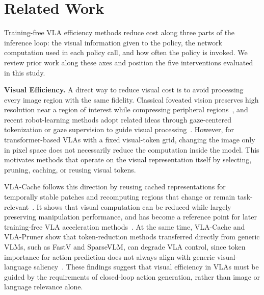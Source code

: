 \section{Related Work}

Training-free VLA efficiency methods reduce cost along three parts of the inference loop: the visual information given to the policy, the network computation used in each policy call, and how often the policy is invoked. We review prior work along these axes and position the five interventions evaluated in this study.

\noindent\textbf{Visual Efficiency.}
A direct way to reduce visual cost is to avoid processing every image region with the same fidelity. Classical foveated vision preserves high resolution near a region of interest while compressing peripheral regions~\cite{schwartz,traver}, and recent robot-learning methods adopt related ideas through gaze-centered tokenization or gaze supervision to guide visual processing~\cite{lookfocusact,gazereg}. However, for transformer-based VLAs with a fixed visual-token grid, changing the image only in pixel space does not necessarily reduce the computation inside the model. This motivates methods that operate on the visual representation itself by selecting, pruning, caching, or reusing visual tokens.

VLA-Cache follows this direction by reusing cached representations for temporally stable patches and recomputing regions that change or remain task-relevant~\cite{vlacache}. It shows that visual computation can be reduced while largely preserving manipulation performance, and has become a reference point for later training-free VLA acceleration methods~\cite{vlapruner,efficientvla,specprune}. At the same time, VLA-Cache and VLA-Pruner show that token-reduction methods transferred directly from generic VLMs, such as FastV and SparseVLM, can degrade VLA control, since token importance for action prediction does not always align with generic visual-language saliency~\cite{fastv,sparsevlm,vlacache,vlapruner}. These findings suggest that visual efficiency in VLAs must be guided by the requirements of closed-loop action generation, rather than image or language relevance alone.

